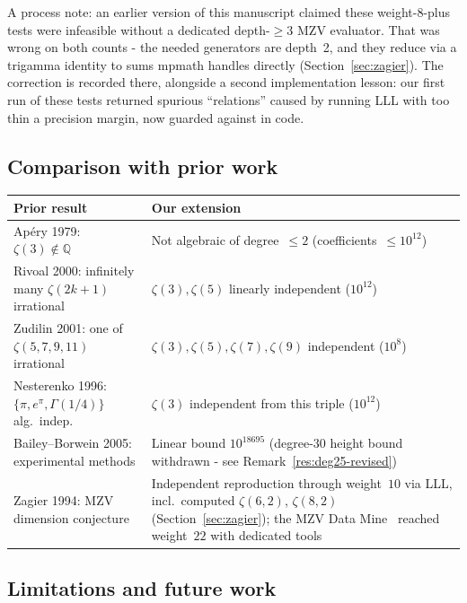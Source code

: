 \documentclass[12pt]{article}
\theoremstyle{definition}
\theoremstyle{remark}
\newcommand{\Q}{\mathbb{Q}}
\begin{document}
A process note: an earlier version of this manuscript claimed these
weight-8-plus tests were infeasible without a dedicated
depth-$\ge 3$ MZV evaluator.  That was wrong on both counts - the
needed generators are depth~2, and they reduce via a trigamma
identity to sums mpmath handles directly
(Section~\ref{sec:zagier}).  The correction is recorded there,
alongside a second implementation lesson: our first run of these
tests returned spurious ``relations'' caused by running LLL with too
thin a precision margin, now guarded against in code.

\subsection{Comparison with prior work}

\begin{center}
\begin{tabular}{@{}p{5.5cm}p{6.5cm}@{}}
\toprule
Prior result & Our extension \\
\midrule
Ap\'ery 1979: $\zeta(3)\notin\Q$ \cite{Apery1979}
  & Not algebraic of degree~$\le 2$ (coefficients~$\le 10^{12}$) \\
Rivoal 2000: infinitely many $\zeta(2k{+}1)$ irrational
  \cite{Rivoal2000}
  & $\zeta(3),\zeta(5)$ linearly independent ($10^{12}$) \\
Zudilin 2001: one of $\zeta(5,7,9,11)$ irrational \cite{Zudilin2001}
  & $\zeta(3),\zeta(5),\zeta(7),\zeta(9)$ independent ($10^8$) \\
Nesterenko 1996: $\{\pi,e^\pi,\Gamma(1/4)\}$ alg.\ indep.\
  \cite{Nesterenko1996}
  & $\zeta(3)$ independent from this triple ($10^{12}$) \\
Bailey--Borwein 2005: experimental methods \cite{BaileyBorwein2005}
  & Linear bound $10^{18695}$ (degree-30 height bound withdrawn - see
  Remark~\ref{res:deg25-revised}) \\
Zagier 1994: MZV dimension conjecture \cite{Zagier1994}
  & Independent reproduction through weight~$10$ via LLL, incl.\
  computed $\zeta(6,2)$, $\zeta(8,2)$ (Section~\ref{sec:zagier}); the
  MZV Data Mine~\cite{BBV2010} reached weight~$22$ with dedicated
  tools \\
\bottomrule
\end{tabular}
\end{center}

\subsection{Limitations and future work}\label{sec:limitations}
\end{document}
